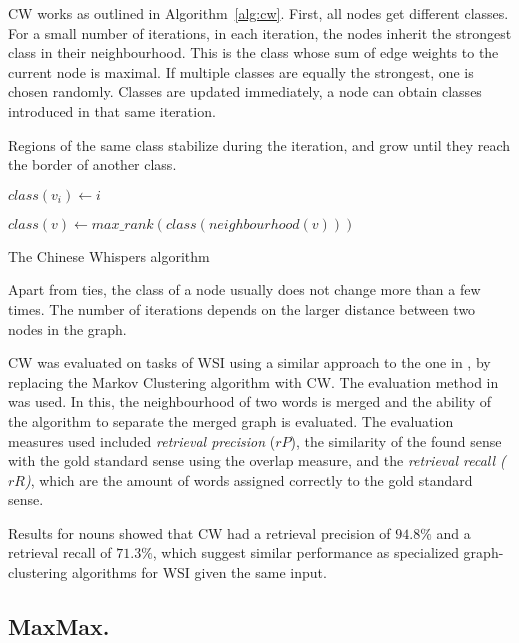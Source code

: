 \ac{CW} works as outlined in Algorithm~\ref{alg:cw}. First, all nodes get
different classes. For a small number of iterations, in each iteration, the
nodes inherit the strongest class in their neighbourhood. This is the class
whose sum of edge weights to the current node is maximal. If multiple classes
are equally the strongest, one is chosen randomly. Classes are updated
immediately, a node can obtain classes introduced in that same iteration.

Regions of the same class stabilize during the iteration, and grow until they
reach the border of another class.

\begin{algorithm}
 \begin{algorithmic}
    \State $class(v_i) \gets i$
   \EndFor

     \State $class(v) \gets max\_rank(class(neighbourhood(v)))$
    \EndFor
   \EndWhile
  \EndFunction
 \end{algorithmic}
 \caption{\label{alg:cw} The Chinese Whispers algorithm}
\end{algorithm}

Apart from ties, the class of a node usually does not change more than a few
times. The number of iterations depends on the larger distance between two nodes
in the graph.

\ac{CW} was evaluated on tasks of \ac{WSI} using a similar approach to the one
in \cite{dorow2003discovering}, by replacing the Markov Clustering algorithm
with \ac{CW}. The evaluation method in \cite{bordag2006word} was used. In this,
the neighbourhood of two words is merged and the ability of the algorithm to
separate the merged graph is evaluated. The evaluation measures used included
\textit{retrieval precision} ($rP$), the similarity of the found sense with the
gold standard sense using the overlap measure, and the \textit{retrieval recall
($rR$)}, which are the amount of words assigned correctly to the gold standard
sense.

Results for nouns showed that \ac{CW} had a retrieval precision of $94.8\%$ and
a retrieval recall of $71.3\%$, which suggest similar performance as specialized
graph-clustering algorithms for \ac{WSI} given the same input.

\subsection{MaxMax.}
\label{sec:maxmax}

